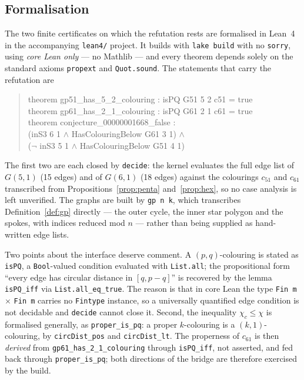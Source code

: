 \documentclass[11pt]{article}
\theoremstyle{definition}
\newcommand{\chic}{\chi_c}
\begin{document}
\subsection*{Formalisation}

The two finite certificates on which the refutation rests are formalised in
Lean~4 in the accompanying \texttt{lean4/} project. It builds with
\texttt{lake build} with no \texttt{sorry}, using \emph{core Lean only} --- no
Mathlib --- and every theorem depends solely on the standard axioms
\texttt{propext} and \texttt{Quot.sound}. The statements that carry the
refutation are

\begin{quote}\ttfamily
theorem gp51\_has\_5\_2\_colouring : isPQ G51 5 2 c51 = true\\[0.5em]
theorem gp61\_has\_2\_1\_colouring : isPQ G61 2 1 c61 = true\\[0.5em]
theorem conjecture\_00000001668\_false :\\
\hspace*{1.5em}(inS3 6 1 $\wedge$ HasColouringBelow G61 3 1) $\wedge$\\
\hspace*{1.5em}($\neg$ inS3 5 1 $\wedge$ HasColouringBelow G51 4 1)
\end{quote}

\noindent The first two are each closed by \texttt{decide}: the kernel
evaluates the full edge list of $G(5,1)$ (15 edges) and of $G(6,1)$ (18 edges)
against the colourings $c_{51}$ and $c_{61}$ transcribed from
Propositions~\ref{prop:penta} and~\ref{prop:hex}, so no case analysis is left
unverified. The graphs are built by \texttt{gp n k}, which transcribes
Definition~\ref{def:gp} directly --- the outer cycle, the inner star polygon
and the spokes, with indices reduced mod $n$ --- rather than being supplied as
hand-written edge lists.

Two points about the interface deserve comment. A $(p,q)$-colouring is stated
as \texttt{isPQ}, a \texttt{Bool}-valued condition evaluated with
\texttt{List.all}; the propositional form ``every edge has circular distance in
$[q, p-q]$'' is recovered by the lemma \texttt{isPQ\_iff} via
\texttt{List.all\_eq\_true}. The reason is that in core Lean the type
\texttt{Fin m} $\times$ \texttt{Fin m} carries no \texttt{Fintype} instance, so
a universally quantified edge condition is not decidable and \texttt{decide}
cannot close it. Second, the inequality $\chic \le \chi$ is formalised
generally, as \texttt{proper\_is\_pq}: a proper $k$-colouring is a
$(k,1)$-colouring, by \texttt{circDist\_pos} and \texttt{circDist\_lt}. The
properness of $c_{61}$ is then \emph{derived} from
\texttt{gp61\_has\_2\_1\_colouring} through \texttt{isPQ\_iff}, not asserted,
and fed back through \texttt{proper\_is\_pq}; both directions of the bridge are
therefore exercised by the build.
\end{document}
